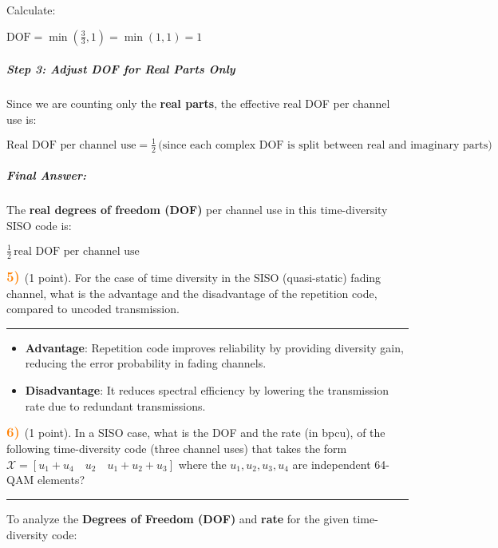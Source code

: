 \documentclass[11pt]{article}
\providecommand{\tightlist}{%
      \setlength{\itemsep}{0pt}\setlength{\parskip}{0pt}}
\begin{document}
Calculate:

\(\text{DOF} = \min\left( \frac{3}{3}, 1 \right) = \min(1, 1) = 1\)

\subparagraph{\texorpdfstring{\textbf{Step 3: Adjust DOF for Real Parts
Only}}{Step 3: Adjust DOF for Real Parts Only}}\label{step-3-adjust-dof-for-real-parts-only}

Since we are counting only the \textbf{real parts}, the effective real
DOF per channel use is:

\(\text{Real DOF per channel use} = \frac{1}{2} \, \text{(since each complex DOF is split between real and imaginary parts)}\)

\subparagraph{\texorpdfstring{\textbf{Final
Answer:}}{Final Answer:}}\label{final-answer}

The \textbf{real degrees of freedom (DOF)} per channel use in this
time-diversity SISO code is:

\(\boxed{\frac{1}{2} \, \text{real DOF per channel use}}\)

    \(\color{orange} \large \textbf{5)}\) (1 point). For the case of time
diversity in the SISO (quasi-static) fading channel, what is the
advantage and the disadvantage of the repetition code, compared to
uncoded transmission.

    \begin{center}\rule{0.5\linewidth}{0.5pt}\end{center}

\begin{itemize}
\tightlist
\item
  \textbf{Advantage}: Repetition code improves reliability by providing
  diversity gain, reducing the error probability in fading channels.\\
\item
  \textbf{Disadvantage}: It reduces spectral efficiency by lowering the
  transmission rate due to redundant transmissions.
\end{itemize}

    \(\color{orange} \large \textbf{6)}\) (1 point). In a SISO case, what is
the DOF and the rate (in bpcu), of the following time-diversity code
(three channel uses) that takes the form
\(\mathcal{X}= {[u_1 + u_4 \quad u_2 \quad u_1 + u_2 + u_3]}\) where the
\(u_1,u_2,u_3,u_4\) are independent 64-QAM elements?

    \begin{center}\rule{0.5\linewidth}{0.5pt}\end{center}

To analyze the \textbf{Degrees of Freedom (DOF)} and \textbf{rate} for
the given time-diversity code:
\end{document}
